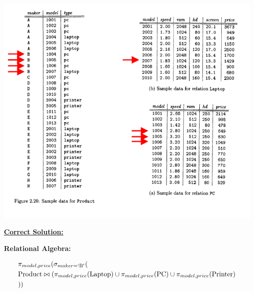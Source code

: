 \documentclass[12pt]{article}
\begin{document}
\begin{enumerate}
\begin{enumerate}[a)]
        \begin{center}
        \includegraphics[width=\linewidth]{images/worksheet_2_solution_8.png}
        \end{center}

        \bigskip

        \begin{mdframed}
            \underline{\textbf{Correct Solution:}}

            \bigskip

            \color{red}

            \textbf{Relational Algebra:}

            \bigskip

            \color{black}

            \begin{align}
                \begin{split}
                &\pi_{model,price}(\sigma_{maker=`\text{B}'}(\\
                &\text{Product} \bowtie (\pi_{model,price}(\text{Laptop}) \cup \pi_{model,price}(\text{PC}) \cup \pi_{model,price}(\text{Printer})\\
                &))
                \end{split}
            \end{align}

            \color{red}

            \bigskip


\end{mdframed}
\end{enumerate}
\end{enumerate}
\end{document}
